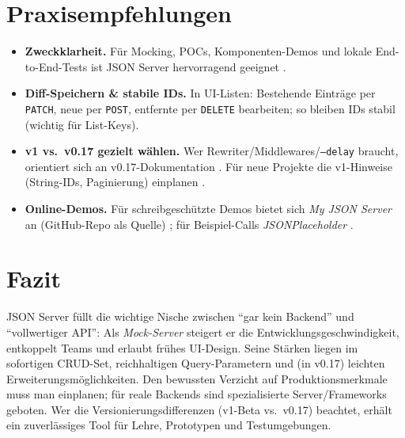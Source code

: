 \documentclass[11pt,a4paper]{article}
\begin{document}
\section{Praxisempfehlungen}
\label{sec:best}
\begin{itemize}
  \item \textbf{Zweckklarheit.} Für Mocking, POCs, Komponenten-Demos und lokale End-to-End-Tests ist JSON Server hervorragend geeignet \cite{jsonserver-github-v0,freecodecamp}. 
  \item \textbf{Diff-Speichern \& stabile IDs.} In UI-Listen: Bestehende Einträge per \texttt{PATCH}, neue per \texttt{POST}, entfernte per \texttt{DELETE} bearbeiten; so bleiben IDs stabil (wichtig für List-Keys).
  \item \textbf{v1 vs.\ v0.17 gezielt wählen.} Wer Rewriter/Middlewares/\texttt{--delay} braucht, orientiert sich an v0.17-Dokumentation \cite{jsonserver-github-v0}. Für neue Projekte die v1-Hinweise (String-IDs, Paginierung) einplanen \cite{jsonserver-github-v1}. 
  \item \textbf{Online-Demos.} Für schreibgeschützte Demos bietet sich \emph{My JSON Server} an (GitHub-Repo als Quelle) \cite{my-json-server}; für Beispiel-Calls \emph{JSONPlaceholder} \cite{jsonplaceholder}.
\end{itemize}

\section{Fazit}
JSON Server füllt die wichtige Nische zwischen \enquote{gar kein Backend} und \enquote{vollwertiger API}: Als \emph{Mock-Server} steigert er die Entwicklungsgeschwindigkeit, entkoppelt Teams und erlaubt frühes UI-Design. Seine Stärken liegen im sofortigen CRUD-Set, reichhaltigen Query-Parametern und (in v0.17) leichten Erweiterungsmöglichkeiten. Den bewussten Verzicht auf Produktionsmerkmale muss man einplanen; für reale Backends sind spezialisierte Server/Frameworks geboten. Wer die Versionierungsdifferenzen (v1-Beta vs.\ v0.17) beachtet, erhält ein zuverlässiges Tool für Lehre, Prototypen und Testumgebungen.
\end{document}
